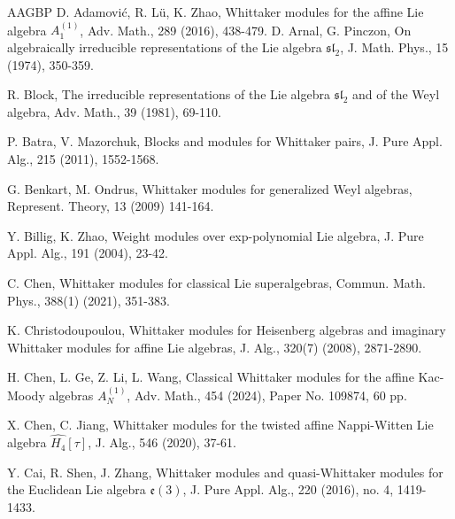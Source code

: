 \documentclass[12pt, a4paper]{amsart}
\theoremstyle{Theorem}
\theoremstyle{Theorem}
\numberwithin{equation}{section}
\begin{document}
\begin{thebibliography}{AAGBP}
D. Adamovi\'{c}, R. L\"{u}, K. Zhao, Whittaker modules for the affine Lie algebra $A_{1}^{(1)}$, Adv. Math., 289 (2016), 438-479.
D. Arnal, G. Pinczon, On algebraically irreducible representations of the Lie algebra $\mathfrak{sl}_2$, J. Math. Phys., 15 (1974), 350-359.



R. Block, The irreducible representations of the Lie algebra $\mathfrak{sl}_2$ and of the Weyl
algebra, Adv. Math., 39 (1981), 69-110.


P. Batra, V. Mazorchuk, Blocks and modules for Whittaker pairs, J. Pure Appl. Alg., 215 (2011), 1552-1568.



G. Benkart, M. Ondrus, Whittaker modules for generalized Weyl algebras, Represent. Theory, 13 (2009) 141-164.


 Y. Billig, K. Zhao, Weight modules over exp-polynomial Lie algebra, J. Pure Appl. Alg., 191 (2004), 23-42.

C. Chen, Whittaker modules for classical Lie superalgebras, Commun. Math. Phys., 388(1) (2021), 351-383.

K. Christodoupoulou, Whittaker modules for Heisenberg algebras and imaginary
Whittaker modules for affine Lie algebras, J. Alg., 320(7) (2008), 2871-2890.

H. Chen, L. Ge, Z. Li, L. Wang, Classical Whittaker modules for the affine Kac-Moody algebras $A^{(1)}_N$,
 Adv. Math., 454 (2024), Paper No. 109874, 60 pp.



X. Chen, C. Jiang, Whittaker modules for the twisted affine Nappi-Witten Lie algebra $\widehat{H_{4}}[\tau]$,
J. Alg., 546 (2020), 37-61.


Y. Cai, R. Shen, J. Zhang, Whittaker modules and quasi-Whittaker modules for the Euclidean Lie algebra $\mathfrak{e}(3)$,
J. Pure Appl. Alg., 220 (2016), no. 4, 1419-1433.


\end{thebibliography}
\end{document}
